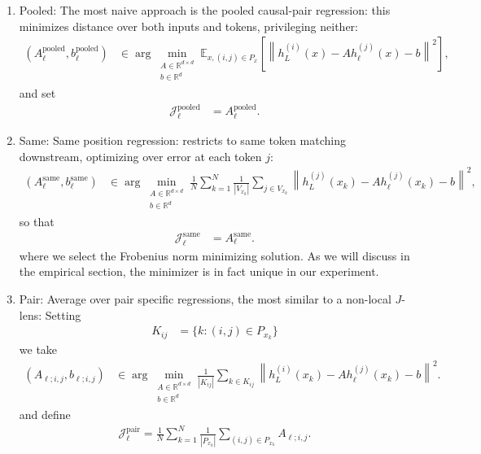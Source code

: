 \documentclass[10pt,oneside,reqno]{amsart}
\theoremstyle{definition}
\numberwithin{equation}{section}
\renewcommand{\b}{\beta}
\begin{document}
\begin{enumerate}

\item Pooled: The most naive approach is the pooled causal-pair regression: this minimizes distance over both inputs and tokens, privileging neither:
\begin{align}\label{eq:pooled}
(A_\ell^{\mathrm{pooled}},b_\ell^{\mathrm{pooled}})
&\in
\arg\min_{\substack{A\in\mathbb R^{d\times d}\\b\in\mathbb R^d}}
\mathbb E_{x,(i,j)\in P_x}
\left[
\left\|h_L^{(i)}(x)-A h_\ell^{(j)}(x)-b\right\|^2
\right],
\end{align}
and set 
\begin{align*}
\mathcal J_\ell^{\mathrm{pooled}}
&=A_\ell^{\mathrm{pooled}}.
\end{align*}



\item Same: Same position regression: restricts to same token matching downstream, optimizing over error at each token $j$:
\begin{align}\label{eq:same}
(A_\ell^{\mathrm{same}},b_\ell^{\mathrm{same}})
&\in
\arg\min_{\substack{A\in\mathbb R^{d\times d}\\b\in\mathbb R^d}}
\frac1N\sum_{k=1}^N\frac1{|V_{x_k}|}
\sum_{j\in V_{x_k}}
\left\|
h_L^{(j)}(x_k)-A h_\ell^{(j)}(x_k)-b
\right\|^2,
\end{align}
so that 
\begin{align*}
\mathcal J_\ell^{\mathrm{same}}
&=A_\ell^{\mathrm{same}}.
\end{align*}
where we select the Frobenius norm minimizing solution. As we will discuss in the empirical section, the minimizer is in fact unique in our experiment.

\item Pair: Average over pair specific regressions, the most similar to a non-local $J$-lens:
Setting 
\begin{align*}
K_{ij}&=\{k:(i,j)\in P_{x_k}\}
\end{align*}
we take 
\begin{align}\label{eq:nonlocalJ}
(A_{\ell;i,j},b_{\ell;i,j})
&\in
\arg\min_{\substack{A\in\mathbb R^{d\times d}\\b\in\mathbb R^d}}
\frac1{|K_{ij}|}\sum_{k\in K_{ij}}
\left\|
h_L^{(i)}(x_k)-A h_\ell^{(j)}(x_k)-b
\right\|^2.
\end{align}
and define
\begin{align*}
\mathcal J_\ell^{\mathrm{pair}}
=
\frac1N\sum_{k=1}^N
\frac1{|P_{x_k}|}
\sum_{(i,j)\in P_{x_k}}A_{\ell;i,j}.
\end{align*}



\end{enumerate}
\end{document}
